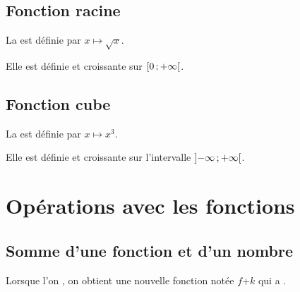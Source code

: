 \documentclass[12pt,a4paper]{article}
\begin{document}
	
	\subsection{Fonction racine}
	
	\begin{mydef}
		La  est définie par $x \mapsto \sqrt{x}$.			
	\end{mydef}
	
	\begin{myprops}
		
		Elle est définie et croissante sur $\mbox{\ensuremath{\left[0\mathpunct{};+\infty\right[}}$.
		
		
	\end{myprops}
	
	
	\subsection{Fonction cube}
	
	
	\begin{mydef}
		La  est définie par $x \mapsto x^3$.			
	\end{mydef}
	
	\begin{myprops}
		Elle est définie et croissante sur l'intervalle $\mbox{\ensuremath{\left]- \infty \mathpunct{};+ \infty\right[}}$.
		
		
	\end{myprops}
	
	
	
	\section{Opérations avec les fonctions}
	
	\subsection{Somme d'une fonction et d'un nombre}
	
	\begin{myprop}
		Lorsque l'on , on obtient une nouvelle fonction notée $f$+$k$ qui a .
	\end{myprop}
	
\end{document}
